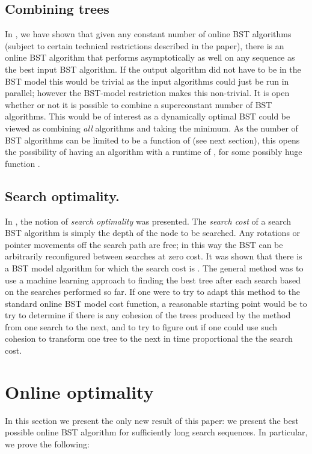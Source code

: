\documentclass[11pt]{article}
\begin{document}
\subsection{Combining trees}
In \cite{DBLP:journals/corr/abs-1304-7604}, we have shown that given any constant number of online BST algorithms (subject to certain technical restrictions described in the paper), there is an online BST algorithm that performs asymptotically as well on any sequence as the best input BST algorithm. If the output algorithm did not have to be in the BST model this would be trivial as the input algorithms could just be run in parallel; however the BST-model restriction makes this non-trivial. It is open whether or not it is possible to combine a superconstant number of BST algorithms. This would be of interest as a dynamically optimal BST could be viewed as combining \emph{all} algorithms and taking the minimum. As the number of BST algorithms can be limited to be a function of  (see next section), this opens the possibility of having an algorithm with a runtime of , for some possibly huge function .




\subsection{Search optimality.} In \cite{DBLP:journals/algorithmica/BlumCK03}, the notion of \emph{search optimality} was presented. The \emph{search cost} of a search BST algorithm is simply the depth of the node to be searched. Any rotations or pointer movements off the search path are free; in this way the BST can be arbitrarily reconfigured between searches at zero cost. It was shown that there is a BST model algorithm for which the search cost is . The general method was to use a machine learning approach to finding the best tree after each search based on the searches performed so far. If one were to try to adapt this method to the standard online BST model cost function, a reasonable starting point would be to try to determine if there is any cohesion of the trees produced by the method from one search to the next, and to try to figure out if one could use such cohesion to transform one tree to the next in time proportional the the search cost. 

\section{Online optimality}

In this section we present the only new result of this paper: we present the best possible online BST algorithm for sufficiently long search sequences. In particular, we prove the following:
\end{document}

